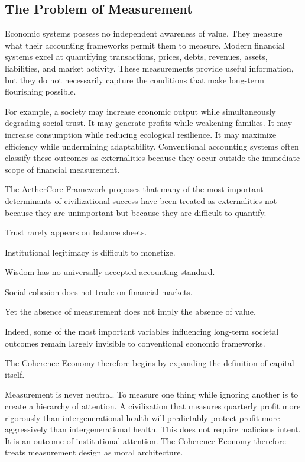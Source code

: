 \documentclass[12pt]{article}
\begin{document}

\subsection{The Problem of Measurement}

Economic systems possess no independent awareness of value. They measure what their accounting frameworks permit them to measure. Modern financial systems excel at quantifying transactions, prices, debts, revenues, assets, liabilities, and market activity. These measurements provide useful information, but they do not necessarily capture the conditions that make long-term flourishing possible.

For example, a society may increase economic output while simultaneously degrading social trust. It may generate profits while weakening families. It may increase consumption while reducing ecological resilience. It may maximize efficiency while undermining adaptability. Conventional accounting systems often classify these outcomes as externalities because they occur outside the immediate scope of financial measurement.

The AetherCore Framework proposes that many of the most important determinants of civilizational success have been treated as externalities not because they are unimportant but because they are difficult to quantify.

Trust rarely appears on balance sheets.

Institutional legitimacy is difficult to monetize.

Wisdom has no universally accepted accounting standard.

Social cohesion does not trade on financial markets.

Yet the absence of measurement does not imply the absence of value.

Indeed, some of the most important variables influencing long-term societal outcomes remain largely invisible to conventional economic frameworks.

The Coherence Economy therefore begins by expanding the definition of capital itself.

Measurement is never neutral. To measure one thing while ignoring another is to create a hierarchy of attention. A civilization that measures quarterly profit more rigorously than intergenerational health will predictably protect profit more aggressively than intergenerational health. This does not require malicious intent. It is an outcome of institutional attention. The Coherence Economy therefore treats measurement design as moral architecture.
\end{document}
